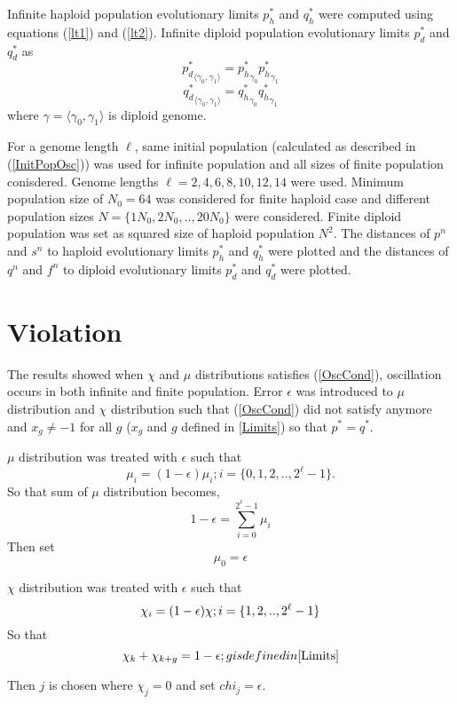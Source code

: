 Infinite haploid population evolutionary limits $p_h^{\ast}$ and $q_h^{\ast}$ were computed using equations (\ref{lt1}) and (\ref{lt2}). 
Infinite diploid population evolutionary limits $p_d^{\ast}$ and $q_d^{\ast}$ as
\[
{p_d^{\ast}}_{\langle \gamma_0, \gamma_1 \rangle} = {p_h^{\ast}}_{\gamma_0} {p_h^{\ast}}_{\gamma_1}
\]
\[
{q_d^{\ast}}_{\langle \gamma_0, \gamma_1 \rangle} = {q_h^{\ast}}_{\gamma_0} {q_h^{\ast}}_{\gamma_1}
\]
where $\gamma = \langle \gamma_0, \gamma_1 \rangle$ is diploid genome.

For a genome length $\ell$, same initial population (calculated as described in (\ref{InitPopOsc})) was used for infinite population and all 
sizes of finite population conisdered.
Genome lengths $\ell = {2, 4, 6, 8, 10, 12, 14}$ were used. Minimum population size of $N_0 = 64$ was considered for finite haploid case and 
different population sizes $N = \{1N_0, 2N_0,.., 20N_0\}$ were considered. Finite diploid population was set as squared size of haploid 
population $N^2$.
The distances of $p^n$ and $s^n$ to haploid evolutionary limits $p_h^{\ast}$ and $q_h^{\ast}$ were plotted and the distances of $q^n$ and 
$f^n$ to diploid evolutionary limits $p_d^{\ast}$ and $q_d^{\ast}$ were plotted.


\section{Violation}
The results showed when $\chi$ and $\mu$ distributions satisfies (\ref{OscCond}), oscillation occurs in both infinite and finite population. 
Error $\epsilon$ was introduced to $\mu$ distribution and $\chi$ distribution such that (\ref{OscCond}) did not satisfy anymore and 
$x_g \neq −1$ for all $g$ ($x_g$ and $g$ defined in \ref{Limits}) so that $p^\ast = q^\ast$.

$\mu$ distribution was treated with $\epsilon$ such that
\[
\mu_i = (1-\epsilon) \mu_i ; i = \{0, 1, 2,.., 2^{\ell}-1\}.
\]
So that sum of $\mu$ distribution becomes, 
\[
1-\epsilon = \sum \limits_{i=0}^{2^{\ell}-1} \mu_i
\]
Then set
\[
\mu_0 = \epsilon
\]

$\chi$ distribution was treated with $\epsilon$ such that
\[
\chi_i = (1-\epsilon) \chi ; i = \{1, 2,.., 2^{\ell}-1\} \\
\]
So that 
\[
\chi_k + \chi_{k+ g} = 1-\epsilon ; g is defined in \ref{Limits}
\]

Then $j$ is chosen where $\chi_j = 0$ and set $chi_j = \epsilon$. \newline

